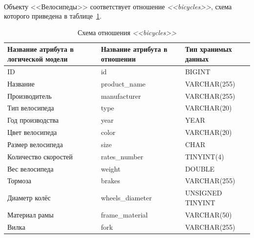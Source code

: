 \paragraph{}
Объекту <<Велосипеды>> соответствует отношение \textit{<<bicycles>>}, схема которого приведена в
таблице~\ref{tbl:bicycles_scheme}.
\begin{table}[h!]
  \caption{Схема отношения \textit{<<bicycles>>}}
  \label{tbl:bicycles_scheme}
  \small{
    \centering
    \begin{tabular}{| p{} | p{} | p{} |}
      \hline
      Название атрибута в \newline логической модели &
      Название атрибута в \newline отношении &
      Тип хранимых данных \\

      \hline
      ID & id & BIGINT \\

      \hline
      Название & product\_name & VARCHAR(255) \\

      \hline
      Производитель & manufacturer & VARCHAR(255) \\

      \hline
      Тип велосипеда & type & VARCHAR(20) \\

      \hline
      Год производства & year & YEAR \\

      \hline
      Цвет велосипеда & color & VARCHAR(20) \\

      \hline
      Размер велосипеда & size & CHAR \\

      \hline
      Количество скоростей & rates\_number & TINYINT(4) \\

      \hline
      Вес велосипеда & weight & DOUBLE \\

      \hline
      Тормоза & brakes & VARCHAR(255) \\

      \hline
      Диаметр колёс & wheels\_diameter & UNSIGNED TINYINT \\

      \hline
      Материал рамы & frame\_material & VARCHAR(50) \\

      \hline
      Вилка & fork & VARCHAR(255) \\


\end{tabular}}
\end{table}
